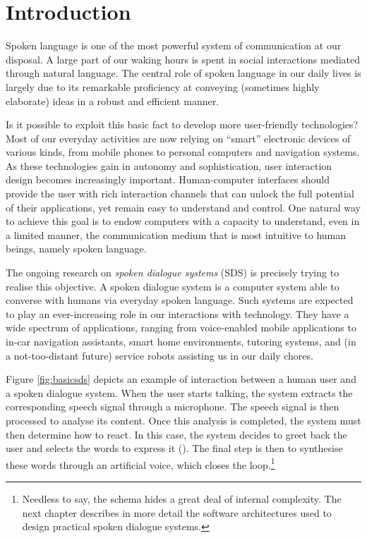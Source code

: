
\chapter{Introduction}
\setcounter{page}{1}

Spoken language is one of the most powerful system of communication at our disposal. A large part of our waking hours is spent in social interactions mediated through natural language.  The central role of spoken language in our daily lives is largely due to its remarkable proficiency at conveying (sometimes highly elaborate) ideas in a robust and efficient manner. 

Is it possible to exploit this basic fact to develop more user-friendly technologies? Most of our everyday activities are now relying on ``smart'' electronic devices of various kinds, from mobile phones to personal computers and navigation systems. As these technologies gain in autonomy and sophistication, user interaction design becomes increasingly important. Human-computer interfaces should provide the user with rich interaction channels that can unlock the full potential of their applications, yet remain easy to understand and control.  One natural way to achieve this goal is to endow computers with a capacity to understand, even in a limited manner, the communication medium that is most intuitive to human beings, namely spoken language.  

The ongoing research on \textit{spoken dialogue systems} (SDS) is precisely trying to realise this objective. A spoken dialogue system is a computer system able to converse with humans via everyday spoken language. Such systems are expected to play an ever-increasing role in our interactions with technology. They have a wide spectrum of applications, ranging from voice-enabled mobile applications to in-car navigation assistants, smart home environments, tutoring systems, and (in a not-too-distant future) service robots assisting us in our daily chores.

Figure \ref{fig:basicsds} depicts an example of interaction between a human user and a spoken dialogue system. When the user starts talking, the system extracts the corresponding speech signal through a microphone.  The speech signal is then processed to analyse its content.  Once this analysis is completed, the system must then determine how to react.  In this case, the system decides to greet back the user and selects the words to express it (). The final step is then to synthesise these words through an artificial voice, which closes the loop.\footnote{ Needless to say, the schema hides a great deal of internal complexity.  The next chapter describes in more detail the software architectures used to design practical spoken dialogue systems.}

